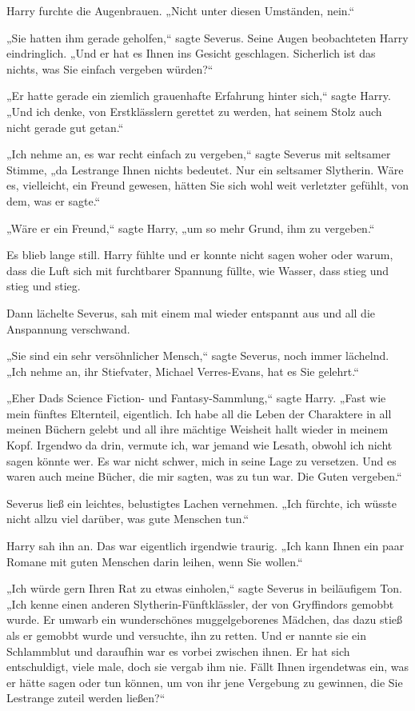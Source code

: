 {Harry furchte die Augenbrauen. „Nicht unter diesen Umständen, nein.“

„Sie hatten ihm gerade geholfen,“ sagte Severus. Seine Augen beobachteten Harry eindringlich. „Und er hat es Ihnen ins Gesicht geschlagen. Sicherlich ist das nichts, was Sie einfach vergeben würden?“

„Er hatte gerade ein ziemlich grauenhafte Erfahrung hinter sich,“ sagte Harry. „Und ich denke, von Erstklässlern gerettet zu werden, hat seinem Stolz auch nicht gerade gut getan.“

„Ich nehme an, es war recht einfach zu vergeben,“ sagte Severus mit seltsamer Stimme, „da Lestrange Ihnen nichts bedeutet. Nur ein seltsamer Slytherin. Wäre es, vielleicht, ein Freund gewesen, hätten Sie sich wohl weit verletzter gefühlt, von dem, was er sagte.“

„Wäre er ein Freund,“ sagte Harry, „um so mehr Grund, ihm zu vergeben.“

Es blieb lange still. Harry fühlte und er konnte nicht sagen woher oder warum, dass die Luft sich mit furchtbarer Spannung füllte, wie Wasser, dass stieg und stieg und stieg.

Dann lächelte Severus, sah mit einem mal wieder entspannt aus und all die Anspannung verschwand.

„Sie sind ein sehr versöhnlicher Mensch,“ sagte Severus, noch immer lächelnd. „Ich nehme an, ihr Stiefvater, Michael Verres-Evans, hat es Sie gelehrt.“

„Eher Dads Science Fiction- und Fantasy-Sammlung,“ sagte Harry. „Fast wie mein fünftes Elternteil, eigentlich. Ich habe all die Leben der Charaktere in all meinen Büchern gelebt und all ihre mächtige Weisheit hallt wieder in meinem Kopf. Irgendwo da drin, vermute ich, war jemand wie Lesath, obwohl ich nicht sagen könnte wer. Es war nicht schwer, mich in seine Lage zu versetzen. Und es waren auch meine Bücher, die mir sagten, was zu tun war. Die Guten vergeben.“

Severus ließ ein leichtes, belustigtes Lachen vernehmen. „Ich fürchte, ich wüsste nicht allzu viel darüber, was gute Menschen tun.“

Harry sah ihn an. Das war eigentlich irgendwie traurig. „Ich kann Ihnen ein paar Romane mit guten Menschen darin leihen, wenn Sie wollen.“

„Ich würde gern Ihren Rat zu etwas einholen,“ sagte Severus in beiläufigem Ton. „Ich kenne einen anderen Slytherin-Fünftklässler, der von Gryffindors gemobbt wurde. Er umwarb ein wunderschönes muggelgeborenes Mädchen, das dazu stieß als er gemobbt wurde und versuchte, ihn zu retten. Und er nannte sie ein Schlammblut und daraufhin war es vorbei zwischen ihnen. Er hat sich entschuldigt, viele male, doch sie vergab ihm nie. Fällt Ihnen irgendetwas ein, was er hätte sagen oder tun können, um von ihr jene Vergebung zu gewinnen, die Sie Lestrange zuteil werden ließen?“

}
